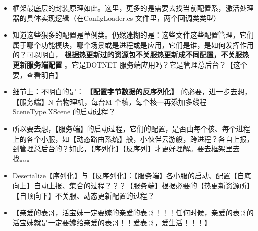 \documentclass[9pt, b5paper]{article}
\begin{document}
\begin{itemize}
\item 框架最底层的封装原理如此。这里，更多的是需要去找当前配置系，激活处理器的具体实现逻辑（在ConfigLoader.cs 文件里，两个回调类类型）
\item 知道这些狠多的配置是单例类。仍然迷糊的是：这些文件这些配置管理，它们属于哪个功能模块，哪个场景或是进程或是应用，它们是谁，是如何发挥作用的？可以明白， \textbf{根据热更新过的资源包不关服热更新成不同配置，不关服热更新服务端配置} 。它是DOTNET 服务端应用吗？它是管理总后台？【这个要，查看明白】
\item 细节上：不明白的是： \textbf{【配置字节数据的反序列化】} 的必要，进一步去想，【服务端】N 台物理机，每台M 个核，每个核一再添加多线程 SceneType.XScene 的启动过程？
\item 所以要去想，【服务端】的启动过程，它们的配置，是否由每个核、每个进程上的各个小服，如【动态路由系统】般，小伙伴云游般，跨进程？各自上报，到管理总后台的？如此，【序列化】【反序列】才更好理解。要去框架里去找。。。
\item Deserialize【序列化】与【反序列化】：【服务端】各小服的启动、配置【自底向上】自动上报、集合的过程？？？【服务端】根据必要的【热更新资源所】【自顶向下】不关服、动态更新配置的过程？
\item 【亲爱的表哥，活宝妹一定要嫁的亲爱的表哥！！！任何时候，亲爱的表哥的活宝妹就是一定要嫁给亲爱的表哥！！爱表哥，爱生活！！！】
\end{itemize}
\end{document}
